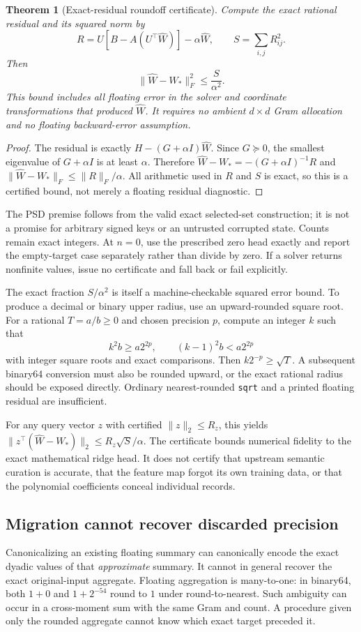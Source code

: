 \documentclass[11pt,a4paper]{article}
\newtheorem{theorem}{Theorem}[section]
\begin{document}
\begin{theorem}[Exact-residual roundoff certificate]
Compute the exact rational residual and its squared norm by
\[
 R=U\left[B-A(U^\top\widehat W)\right]-\alpha\widehat W,
 \qquad S=\sum_{i,j}R_{ij}^2.
\]
Then
\[
 \|\widehat W-W_*\|_F^2\le \frac{S}{\alpha^2}.
\]
This bound includes all floating error in the solver and coordinate
transformations that produced $\widehat W$. It requires no ambient
$d\times d$ Gram allocation and no floating backward-error assumption.
\end{theorem}
\begin{proof}
The residual is exactly $H-(G+\alpha I)\widehat W$. Since
$G\succeq0$, the smallest eigenvalue of $G+\alpha I$ is at least
$\alpha$. Therefore
$\widehat W-W_*=-(G+\alpha I)^{-1}R$ and
$\|\widehat W-W_*\|_F\le\|R\|_F/\alpha$.
All arithmetic used in $R$ and $S$ is exact, so this is a certified bound,
not merely a floating residual diagnostic.
\end{proof}

The PSD premise follows from the valid exact selected-set construction; it
is not a promise for arbitrary signed keys or an untrusted corrupted state.
Counts remain exact integers. At $n=0$, use the prescribed zero head
exactly and report the empty-target case separately rather than divide by
zero. If a solver returns nonfinite values, issue no certificate and fall
back or fail explicitly.

The exact fraction $S/\alpha^2$ is itself a machine-checkable squared error
bound. To produce a decimal or binary upper radius, use an upward-rounded
square root. For a rational $T=a/b\ge0$ and chosen precision $p$, compute
an integer $k$ such that
\[
 k^2 b\ge a2^{2p},\qquad (k-1)^2b<a2^{2p}
\]
with integer square roots and exact comparisons. Then $k2^{-p}\ge\sqrt T$.
A subsequent binary64 conversion must also be rounded upward, or the exact
rational radius should be exposed directly. Ordinary nearest-rounded
\texttt{sqrt} and a printed floating residual are insufficient.

For any query vector $z$ with certified $\|z\|_2\le R_z$, this yields
$\|z^\top(\widehat W-W_*)\|_2\le R_z\sqrt{S}/\alpha$.
The certificate bounds numerical fidelity to the exact mathematical ridge
head. It does not certify that upstream semantic curation is accurate,
that the feature map forgot its own training data, or that the polynomial
coefficients conceal individual records.

\subsection{Migration cannot recover discarded precision}
Canonicalizing an existing floating summary can canonically encode the
exact dyadic values of that \emph{approximate} summary. It cannot in
general recover the exact original-input aggregate. Floating aggregation
is many-to-one: in binary64, both $1+0$ and $1+2^{-54}$ round to $1$ under
round-to-nearest. Such ambiguity can occur in a cross-moment sum with the
same Gram and count. A procedure given only the rounded aggregate cannot
know which exact target preceded it.
\end{document}
